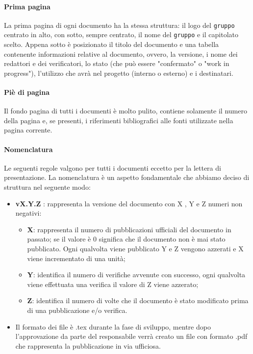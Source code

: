\paragraph{Prima pagina\\} 
La prima pagina di ogni documento ha la stessa struttura: il logo del \texttt{gruppo} centrato in alto, con sotto, sempre centrato, il nome del \texttt{gruppo} e il capitolato scelto. Appena sotto è posizionato il titolo del documento e una tabella contenente informazioni relative al documento, ovvero, la versione, i nome dei redattori e dei verificatori, lo stato (che può essere "confermato" o "work in progress"), l'utilizzo che avrà nel progetto (interno o esterno) e i destinatari.

\paragraph{Piè di pagina\\}
Il fondo pagina di tutti i documenti è molto pulito, contiene solamente il numero della pagina e, se presenti, i riferimenti bibliografici alle fonti utilizzate nella pagina corrente.

\paragraph{Nomenclatura\\}
Le seguenti regole valgono per tutti i documenti eccetto per la lettera di presentazione. La nomenclatura è un aspetto fondamentale che abbiamo deciso di struttura nel seguente modo: 
\begin{itemize}
	\item \textbf{vX.Y.Z }: rappresenta la versione del documento con X , Y e Z numeri non negativi:
	\begin{itemize}
		\item \textbf{X}: rappresenta il numero di pubblicazioni ufficiali del documento in passato; se il valore è 0 significa che il documento non è mai stato pubblicato. Ogni qualvolta viene pubblicato Y e Z vengono azzerati e X viene incrementato di una unità;
		\item \textbf{Y}: identifica il numero di verifiche avvenute con successo, ogni qualvolta viene effettuata una verifica il valore di Z viene azzerato;
		\item \textbf{Z}: identifica il numero di volte che il documento è stato modificato prima di una pubblicazione e/o verifica.
	\end{itemize}
	\item Il formato dei file è .tex durante la fase di sviluppo, mentre dopo l'approvazione da parte del responsabile verrà creato un file con formato .pdf che rappresenta la pubblicazione in via ufficiosa.
\end{itemize}

